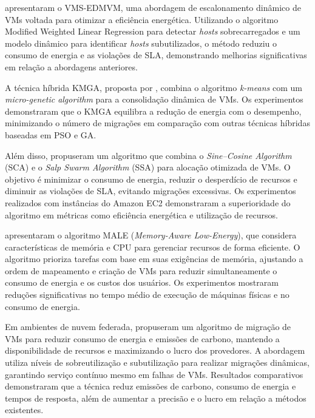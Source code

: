 \documentclass[
	12pt,				%
	oneside,			%
	a4paper,			%
	english,			%
	brazil				%
	]{abntex2ppgsi}
\begin{document}
 apresentaram o VMS-EDMVM, uma abordagem de escalonamento dinâmico de VMs voltada para otimizar a eficiência energética. Utilizando o algoritmo Modified Weighted Linear Regression para detectar \textit{hosts} sobrecarregados e um modelo dinâmico para identificar \textit{hosts} subutilizados, o método reduziu o consumo de energia e as violações de SLA, demonstrando melhorias significativas em relação a abordagens anteriores.

A técnica híbrida KMGA, proposta por , combina o algoritmo \textit{k-means} com um \textit{micro-genetic algorithm} para a consolidação dinâmica de VMs. Os experimentos demonstraram que o KMGA equilibra a redução de energia com o desempenho, minimizando o número de migrações em comparação com outras técnicas híbridas baseadas em PSO e GA.

Além disso,  propuseram um algoritmo que combina o \textit{Sine–Cosine Algorithm} (SCA) e o \textit{Salp Swarm Algorithm} (SSA) para alocação otimizada de VMs. O objetivo é minimizar o consumo de energia, reduzir o desperdício de recursos e diminuir as violações de SLA, evitando migrações excessivas. Os experimentos realizados com instâncias do Amazon EC2 demonstraram a superioridade do algoritmo em métricas como eficiência energética e utilização de recursos.

 apresentaram o algoritmo MALE (\textit{Memory-Aware Low-Energy}), que considera características de memória e CPU para gerenciar recursos de forma eficiente. O algoritmo prioriza tarefas com base em suas exigências de memória, ajustando a ordem de mapeamento e criação de VMs para reduzir simultaneamente o consumo de energia e os custos dos usuários. Os experimentos mostraram reduções significativas no tempo médio de execução de máquinas físicas e no consumo de energia.

Em ambientes de nuvem federada,  propuseram um algoritmo de migração de VMs para reduzir consumo de energia e emissões de carbono, mantendo a disponibilidade de recursos e maximizando o lucro dos provedores. A abordagem utiliza níveis de sobreutilização e subutilização para realizar migrações dinâmicas, garantindo serviço contínuo mesmo em falhas de VMs. Resultados comparativos demonstraram que a técnica reduz emissões de carbono, consumo de energia e tempos de resposta, além de aumentar a precisão e o lucro em relação a métodos existentes.
\end{document}
